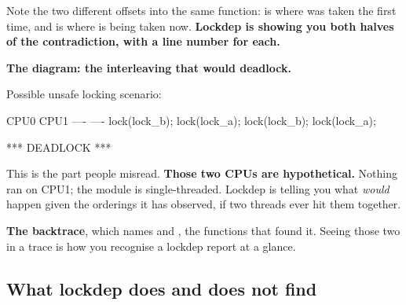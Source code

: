 \noindent Note the two different offsets into the same function:  is where
 was taken the first time, and  is where  is being taken now.
\textbf{Lockdep is showing you both halves of the contradiction, with a line number for each.}

\textbf{The diagram: the interleaving that would deadlock.}

\begin{console}
 Possible unsafe locking scenario:

       CPU0                    CPU1
       ----                    ----
  lock(lock_b);
                               lock(lock_a);
                               lock(lock_b);
  lock(lock_a);

 *** DEADLOCK ***
\end{console}

\noindent This is the part people misread. \textbf{Those two CPUs are hypothetical.} Nothing ran on
CPU1; the module is single-threaded. Lockdep is telling you what \emph{would} happen given the
orderings it has observed, if two threads ever hit them together.

\textbf{The backtrace}, which names  and , the
functions that found it. Seeing those two in a trace is how you recognise a lockdep report at a
glance.

\subsection{What lockdep does and does not find}
\label{c7:app:b5}

